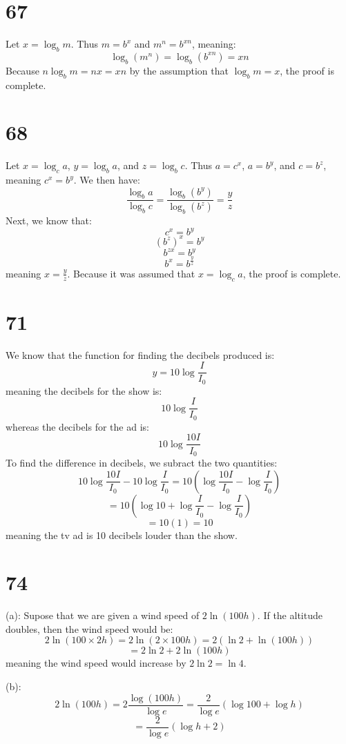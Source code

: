 \documentclass{article}
\theoremstyle{definition}
\newcommand{\?}{\stackrel{?}{=}}
\begin{document}
\section*{67}
Let $x=\log_b m$. Thus $m=b^x$ and $m^n=b^{xn}$, meaning:
\[ \log_b \left( m^n\right)=\log_b\left( b^{xn}\right)=xn \] Because $n\log_b m=nx=xn$ by the assumption that $\log_b m=x$, the proof is complete.

\section*{68}
Let $x=\log_c a$, $y=\log_b a$, and $z=\log_b c$. Thus $a=c^x$, $a=b^y$, and $c=b^z$, meaning $c^x=b^y$. We then have:
\[ \frac{\log_b a}{\log_b c}=\frac{\log_b\left( b^y\right)}{\log_b\left( b^z\right)}=\frac{y}{z} \] Next, we know that:
\[ c^x=b^y \] \[ (b^z)^x=b^y \] \[ b^{zx}=b^y \] \[ b^x=b^\frac{y}{z} \] meaning $x=\frac{y}{z}$. 
Because it was assumed that $x=\log_c a$, the proof is complete.

\section*{71}
We know that the function for finding the decibels produced is:
\[ y=10\log\frac{I}{I_0} \] meaning the decibels for the show is:
\[ 10\log\frac{I}{I_0} \] whereas the decibels for the ad is: \[ 10\log\frac{10I}{I_0} \]
To find the difference in decibels, we subract the two quantities:
\[ 10\log\frac{10I}{I_0}-10\log\frac{I}{I_0}=10(\log\frac{10I}{I_0}-\log\frac{I}{I_0}) \]
\[ =10\left( \log 10+\log\frac{I}{I_0}-\log\frac{I}{I_0}\right) \]
\[ =10(1)=10 \]
meaning the tv ad is 10 decibels louder than the show.

\section*{74}
(a): Supose that we are given a wind speed of $2\ln\left( 100h\right)$. If the altitude doubles, then the wind speed would be:
\[ 2\ln\left(100\times 2h\right)=2\ln\left( 2\times 100h\right)=2(\ln 2+\ln\left( 100h\right) ) \]
\[ =2\ln 2+2\ln\left( 100h\right) \]
meaning the wind speed would increase by $2\ln 2=\ln 4$.


(b): \[ 2\ln\left(100h\right)=2\dfrac{\log\left( 100h\right)}{\log e}=\frac{2}{\log e}\left( \log 100+\log h\right) \]
\[ =\frac{2}{\log e}\left( \log h+2\right) \] 
\end{document}
